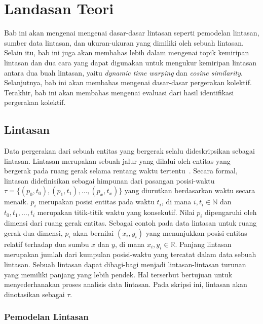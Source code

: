 \chapter{Landasan Teori}
\label{chap:teori}

Bab ini akan mengenai mengenai dasar-dasar lintasan seperti pemodelan lintasan, sumber data lintasan, dan ukuran-ukuran yang dimiliki oleh sebuah lintasan. Selain itu, bab ini juga akan membahas lebih dalam mengenai topik kemiripan lintasan dan dua cara yang dapat digunakan untuk mengukur kemiripan lintasan antara dua buah lintasan, yaitu \textit{dynamic time warping} dan \textit{cosine similarity}. Selanjutnya, bab ini akan membahas mengenai dasar-dasar pergerakan kolektif. Terakhir, bab ini akan membahas mengenai evaluasi dari hasil identifikasi pergerakan kolektif.

\section{Lintasan}
\label{sec:lintasan}

Data pergerakan dari sebuah entitas yang bergerak selalu dideskripsikan sebagai lintasan. Lintasan merupakan sebuah jalur yang dilalui oleh entitas yang bergerak pada ruang gerak selama rentang waktu tertentu~\cite{wiratma:trajectory}. Secara formal, lintasan didefinisikan sebagai himpunan dari pasangan posisi-waktu $\tau = \{(p_0, t_0), (p_1, t_1), \ldots, (p_x, t_x)\}$ yang diurutkan berdasarkan waktu secara menaik. $p_i$ merupakan posisi entitas pada waktu $t_i$, di mana $i, t_i \in \mathbb{N}$ dan $t_0, t_1, \ldots, t_i$ merupakan titik-titik waktu yang konsekutif. Nilai $p_i$ dipengaruhi oleh dimensi dari ruang gerak entitas. Sebagai contoh pada data lintasan untuk ruang gerak dua dimensi, $p_i$ akan bernilai $(x_i, y_i)$ yang menunjukkan posisi entitas relatif terhadap dua sumbu $x$ dan $y$, di mana $x_i, y_i \in \mathbb{R}$. Panjang lintasan merupakan jumlah dari kumpulan posisi-waktu yang tercatat dalam data sebuah lintasan. Sebuah lintasan dapat dibagi-bagi menjadi lintasan-lintasan turunan yang memiliki panjang yang lebih pendek. Hal terserbut bertujuan untuk menyederhanakan proses analisis data lintasan. Pada skripsi ini, lintasan akan dinotasikan sebagai $\tau$.

\subsection{Pemodelan Lintasan}
\label{subsec:pemodelan}

